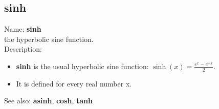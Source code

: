 \subsection{ sinh }
\noindent Name: \textbf{sinh}\\
the hyperbolic sine function.\\

\noindent Description: \begin{itemize}

\item \textbf{sinh} is the usual hyperbolic sine function: $\sinh(x) = \frac{e^x - e^{-x}}{2}$.

\item It is defined for every real number x.
\end{itemize}
See also: \textbf{asinh}, \textbf{cosh}, \textbf{tanh}
